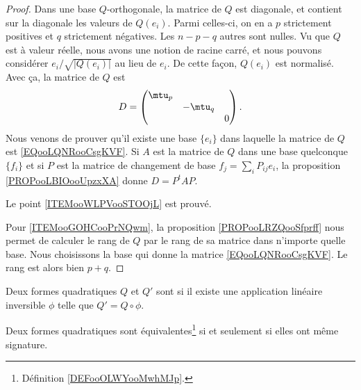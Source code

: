 \begin{proof}
    Dans une base \( Q\)-orthogonale, la matrice de \( Q\) est diagonale, et contient sur la diagonale les valeurs de \( Q(e_i)\). Parmi celles-ci, on en a \( p\) strictement positives et \( q\) strictement négatives. Les \( n-p-q\) autres sont nulles. Vu que \( Q\) est à valeur réelle, nous avons une notion de racine carré, et nous pouvons considérer \( e_i/\sqrt{ | Q(e_i) | }\) au lieu de \( e_i\). De cette façon, \( Q(e_i)\) est normalisé. Avec ça, la matrice de \( Q\) est
    \begin{equation}        \label{EQooLQNRooCsgKVF}
        D=\begin{pmatrix}
            \mtu_p    &       &       \\
                &   -\mtu_q    &       \\
                &       &   0
        \end{pmatrix}.
    \end{equation}
    Nous venons de prouver qu'il existe une base \( \{ e_i \}\) dans laquelle la matrice de \( Q\) est \eqref{EQooLQNRooCsgKVF}. Si \( A\) est la matrice de \( Q\) dans une base quelconque \( \{ f_i \}\) et si \( P\) est la matrice de changement de base \( f_j=\sum_iP_{ij}e_i\), la proposition \ref{PROPooLBIOooUpzxXA} donne \(D= P^tAP\).

    Le point \ref{ITEMooWLPVooSTOOjL} est prouvé.

    Pour \ref{ITEMooGOHCooPrNQwm}, la proposition \ref{PROPooLRZQooSfprff} nous permet de calculer le rang de \( Q\) par le rang de sa matrice dans n'importe quelle base. Nous choisissons la base qui donne la matrice \eqref{EQooLQNRooCsgKVF}. Le rang est alors bien \( p+q\).
\end{proof}


\begin{definition}        \label{DEFooOLWYooMwhMJp}
    Deux formes quadratiques $Q$ et $Q'$ sont  si il existe une application linéaire inversible \( \phi\) telle que \( Q'=Q\circ \phi\).
\end{definition}

\begin{proposition}       \label{PROPooBWXMooLsgyKm}
    Deux formes quadratiques sont équivalentes\footnote{Définition \ref{DEFooOLWYooMwhMJp}.} si et seulement si elles ont même signature.
\end{proposition}


